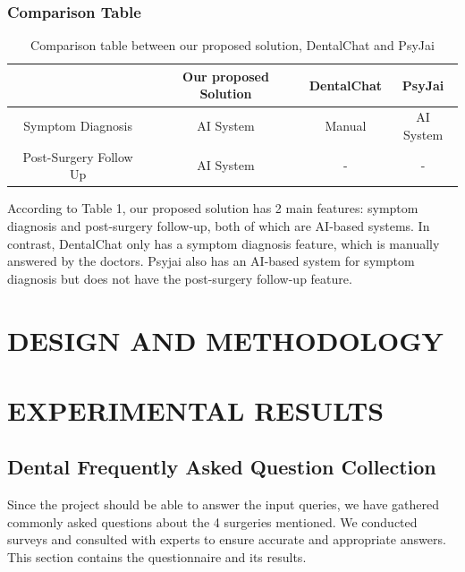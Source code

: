 \documentclass[12pt,oneside,openright,a4paper]{cpe-english-project}
\begin{document}
      \subsection{Comparison Table}
        \begin{table}[h]
          \centering
          \caption{\centering Comparison table between our proposed solution, DentalChat and PsyJai}\label{tab:Comparison_Table}
          \begin{tabular}{|c|c|c|c|} \hline
            & Our proposed Solution & DentalChat & PsyJai \\\hline
            Symptom Diagnosis & AI System & Manual & AI System \\\hline
            Post-Surgery Follow Up & AI System & - & - \\\hline
          \end{tabular}
        \end{table}
        \qquad According to Table 1, our proposed solution has 2 main features: symptom diagnosis and post-surgery follow-up, both of which are AI-based systems. In contrast, DentalChat only has a symptom diagnosis feature, which is manually answered by the doctors. Psyjai also has an AI-based system for symptom diagnosis but does not have the post-surgery follow-up feature.\par

\chapter{DESIGN AND METHODOLOGY}

\chapter{EXPERIMENTAL RESULTS}
  \section{Dental Frequently Asked Question Collection}
    \qquad Since the project should be able to answer the input queries, we have gathered commonly asked questions about the 4 surgeries mentioned. We conducted surveys and consulted with experts to ensure accurate and appropriate answers. This section contains the questionnaire and its results. \par
\end{document}
